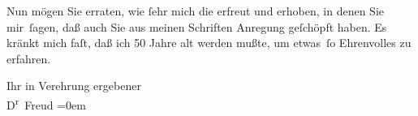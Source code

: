 \pstart
           {\pb}Nun mögen Sie erraten, wie ſehr mich
                  die \label{K_L03819-2v}\label{K_L03819-2} erfreut und erhoben, in denen Sie mir ſagen, daß auch Sie aus meinen
                  Schriften Anregung geſchöpft haben. Es kränkt mich faſt, daß ich 50 Jahre alt
                  werden mußte, um etwas ſo Ehrenvolles zu erfahren.\pend
           
\pstart
           Ihr in Verehrung
                     ergebener{\\[\baselineskip]}\spacefill\mbox{D\textsuperscript{r} Freud}\pend
           \leftskip=0em{}\endnumbering{}
\begin{anhang}
\end{anhang}
      